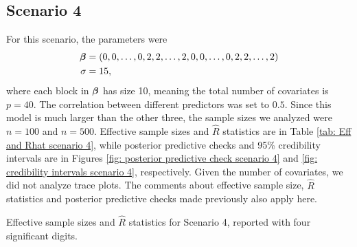 \documentclass[a4paper, 10pt]{article}
\begin{document}
\subsection*{Scenario 4}
For this scenario, the parameters were
\begin{align*}
    \boldsymbol{\beta} &= (0, 0, \dots, 0, 2, 2, \dots, 2, 0, 0, \dots, 0, 2, 2, \dots, 2) \\
    \sigma &= 15
,\end{align*}
where each block in $ \boldsymbol{\beta} $ has size 10, meaning the total number of covariates is $ p = 40 $.
The correlation between different predictors was set to $ 0.5 $.
Since this model is much larger than the other three, the sample sizes we analyzed were $ n = 100 $ and $ n = 500 $.
Effective sample sizes and $ \hat{ R } $ statistics are in Table \ref{tab: Eff and Rhat scenario 4}, while posterior predictive checks and 95\% credibility intervals are in Figures \ref{fig: posterior predictive check scenario 4} and \ref{fig: credibility intervals scenario 4}, respectively.
Given the number of covariates, we did not analyze trace plots.
The comments about effective sample size, $ \hat{ R } $ statistics and posterior predictive checks made previously also apply here.
\begin{table}[htb]
    \centering
    
    \quad
    
    \caption{Effective sample sizes and $ \hat{ R } $ statistics for Scenario 4, reported with four significant digits.}
    \label{tab: Eff and Rhat scenario 4}
\end{table}
\end{document}
